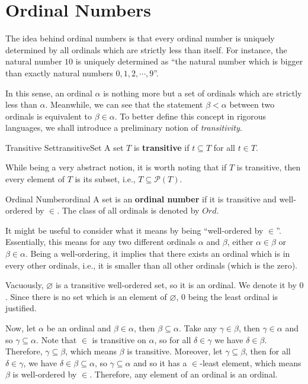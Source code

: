 \documentclass[math]{amznotes}
\theoremstyle{remark}
\begin{document}
\section{Ordinal Numbers}
The idea behind ordinal numbers is that every ordinal number is uniquely determined by all ordinals which are strictly less than itself. For instance, the natural number $10$ is uniquely determined as ``the natural number which is bigger than exactly natural numbers $0, 1, 2, \cdots, 9$''. 

In this sense, an ordinal $\alpha$ is nothing more but a set of ordinals which are strictly less than $\alpha$. Meanwhile, we can see that the statement $\beta < \alpha$ between two ordinals is equivalent to $\beta \in \alpha$. To better define this concept in rigorous languages, we shall introduce a preliminary notion of \textit{transitivity}.
\begin{dfnbox}{Transitive Set}{transitiveSet}
    A set $T$ is {\color{red} \textbf{transitive}} if $t \subseteq T$ for all $t \in T$.
\end{dfnbox}
While being a very abstract notion, it is worth noting that if $T$ is transitive, then every element of $T$ is its subset, i.e., $T \subseteq \mathcal{P}(T)$.
\begin{dfnbox}{Ordinal Number}{ordinal}
    A set is an {\color{red} \textbf{ordinal number}} if it is transitive and well-ordered by $\in$. The class of all ordinals is denoted by $Ord$.
\end{dfnbox}
It might be useful to consider what it means by being ``well-ordered by $\in$''. Essentially, this means for any two different ordinals $\alpha$ and $\beta$, either $\alpha \in \beta$ or $\beta \in \alpha$. Being a well-ordering, it implies that there exists an ordinal which is in every other ordinals, i.e., it is smaller than all other ordinals (which is the zero).

Vacuously, $\varnothing$ is a transitive well-ordered set, so it is an ordinal. We denote it by $0$. Since there is no set which is an element of $\varnothing$, $0$ being the least ordinal is justified.

Now, let $\alpha$ be an ordinal and $\beta \in \alpha$, then $\beta \subseteq \alpha$. Take any $\gamma \in \beta$, then $\gamma \in \alpha$ and so $\gamma \subseteq \alpha$. Note that $\in$ is transitive on $\alpha$, so for all $\delta \in \gamma$ we have $\delta \in \beta$. Therefore, $\gamma \subseteq \beta$, which means $\beta$ is transitive. Moreover, let $\gamma \subseteq \beta$, then for all $\delta \in \gamma$, we have $\delta \in \beta \subseteq \alpha$, so $\gamma \subseteq \alpha$ and so it has a $\in$-least element, which means $\beta$ is well-ordered by $\in$. Therefore, any element of an ordinal is an ordinal.
\end{document}
